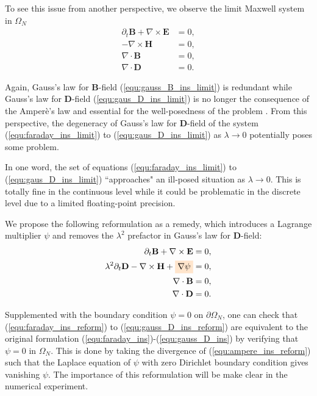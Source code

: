 \documentclass{article}
\begin{document}
To see this issue from another perspective, we observe the limit Maxwell system in $\Omega_N$
\begin{subequations}
\begin{align}
    \partial_t \mathbf{B} + \nabla \times \mathbf{E} &= 0, \label{equ:faraday_ins_limit}\\ 
    - \nabla \times \mathbf{H} &= 0,  \label{equ:ampere_ins_limit}\\
    \nabla \cdot \mathbf{B} &= 0, \label{equ:gauss_B_ins_limit}\\
    \nabla \cdot \mathbf{D} &= 0 \label{equ:gaus_D_ins_limit}.
\end{align}
\end{subequations}

Again, Gauss's law for $\mathbf{B}$-field (\ref{equ:gauss_B_ins_limit}) is redundant while Gauss's law for $\mathbf{D}$-field (\ref{equ:gaus_D_ins_limit}) is no longer the consequence of the Amper\`{e}'s law and essential for the well-posedness of the problem \citep{ana_2010}. From this perspective, the degeneracy of Gauss's law for $\mathbf{D}$-field of the system (\ref{equ:faraday_ins_limit}) to (\ref{equ:gaus_D_ins_limit}) as $\lambda \rightarrow 0$ potentially poses some problem.

In one word, the set of equations (\ref{equ:faraday_ins_limit}) to (\ref{equ:gaus_D_ins_limit}) ``approaches" an ill-posed situation as $\lambda \rightarrow 0$. This is totally fine in the continuous level while it could be problematic in the discrete level due to a limited floating-point precision. 

We propose the following reformulation as a remedy, which introduces a Lagrange multiplier $\psi$ and removes the $\lambda^2$ prefactor in Gauss's law for $\mathbf{D}$-field:
\begin{subequations}
\begin{align}
    \partial_t \mathbf{B} + \nabla \times \mathbf{E} &= 0, \label{equ:faraday_ins_reform}\\ 
    \lambda^2 \partial_t \mathbf{D} - \nabla \times \mathbf{H} + \colorbox{orange!20}{$\nabla \psi$} &= 0,  \label{equ:ampere_ins_reform}\\
    \nabla \cdot \mathbf{B} &= 0, \label{equ:gauss_B_ins_reform}\\
    \nabla \cdot \mathbf{D} &= 0 \label{equ:gauss_D_ins_reform}.
\end{align}
\end{subequations}

Supplemented with the boundary condition $\psi = 0$ on $\partial\Omega_N$, one can check that (\ref{equ:faraday_ins_reform}) to (\ref{equ:gauss_D_ins_reform}) are equivalent to the original formulation (\ref{equ:faraday_ins})-(\ref{equ:gauss_D_ins}) by verifying that $\psi = 0$ in $\Omega_N$. This is done by taking the divergence of (\ref{equ:ampere_ins_reform}) such that the Laplace equation of $\psi$ with zero Dirichlet boundary condition gives vanishing $\psi$. The importance of this reformulation will be make clear in the numerical experiment. 
\end{document}
